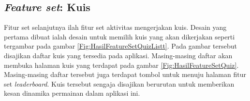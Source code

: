 \subsection{\textit{Feature set}: Kuis}
Fitur set selanjutnya ilah fitur set aktivitas mengerjakan kuis. 
Desain yang pertama dibuat ialah desain untuk memilih kuis yang akan dikerjakan seperti tergambar pada gambar \ref*{Fig:HasilFeatureSetQuizListt}.
Pada gambar tersebut disajikan daftar kuis yang tersedia pada aplikasi.
Masing-masing daftar akan membuka halaman kuis yang terdapat pada gambar \ref*{Fig:HasilFeatureSetQuiz}.
Masing-masing daftar tersebut juga terdapat tombol untuk menuju halaman fitur set \textit{leaderboard}.
Kuis tersebut sengaja disajikan berurutan untuk memberikan kesan dinamika permainan dalam aplikasi ini.
\begin{figure}[H]
	\centering
	\begin{subfigure}[b]{0.3\textwidth}
		\centering

\end{subfigure}
\end{figure}

